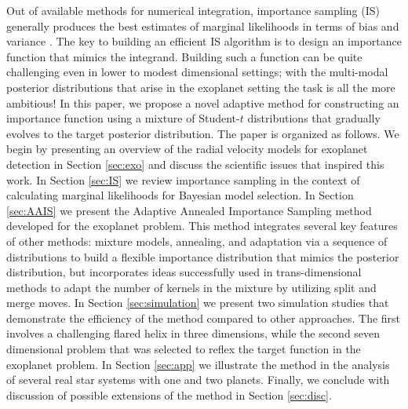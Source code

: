 Out of available methods for numerical integration, importance
sampling (IS) generally produces the best estimates of marginal
likelihoods in terms of bias and variance \citep{Christian's
  comparisons?}. The key to building an efficient IS algorithm is to
design an importance function that mimics the integrand.  Building
such a function can be quite challenging even in lower to modest
dimensional settings; with the multi-modal posterior distributions
that arise in the exoplanet setting the task is all the more
ambitious!  In this paper, we propose a novel adaptive method for
constructing an importance function using a mixture of Student-$t$
distributions that gradually evolves to the target posterior
distribution.  The paper is organized as follows.  We begin by
presenting an overview of the radial velocity models for exoplanet
detection in Section \ref{sec:exo} and discuss the scientific issues
that inspired this work. In Section \ref{sec:IS} we review importance
sampling in the context of calculating marginal likelihoods for
Bayesian model selection. In Section \ref{sec:AAIS} we present the
Adaptive Annealed Importance Sampling method developed for the
exoplanet problem. This method integrates several key features of
other methods: mixture models, annealing, and adaptation via a
sequence of distributions to build a flexible importance distribution
that mimics the posterior distribution, but incorporates ideas
successfully used in trans-dimensional methods to adapt the number of
kernels in the mixture by utilizing split and merge moves.  In Section
\ref{sec:simulation} we present two simulation studies that
demonstrate the efficiency of the method compared to other approaches.
The first involves a challenging flared helix in three dimensions,
while the second seven dimensional problem that was selected to reflex
the target function in the exoplanet problem.  In Section
\ref{sec:app} we illustrate the method in the analysis of several real
star systems with one and two planets. Finally, we conclude with
discussion of possible extensions of the method in Section
\ref{sec:disc}.
